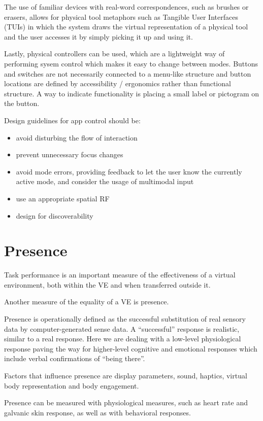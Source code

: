 \documentclass[a4paper]{article}
\begin{document}
The use of familiar devices with real-word correspondences, such as brushes or erasers, allows for physical tool metaphors such as Tangible User Interfaces (TUIs) in which the system draws the virtual representation of a physical tool and the user accesses it by simply picking it up and using it.

Lastly, physical controllers can be used, which are a lightweight way of performing sysem control which makes it easy to change between modes.
Buttons and switches are not necessarily connected to a menu-like structure and button locations are defined by accessibility / ergonomics rather than functional structure.
A way to indicate functionality is placing a small label or pictogram on the button.

Design guidelines for app control should be:
\begin{itemize}
  \item avoid disturbing the flow of interaction
  \item prevent unnecessary focus changes
  \item avoid mode errors, providing feedback to let the user know the currently active mode, and consider the usage of multimodal input
  \item use an appropriate spatial RF
  \item design for discoverability
\end{itemize}


\section{Presence}

Task performance is an important measure of the effectiveness of a
virtual environment, both within the VE and when transferred outside it.

Another measure of the equality of a VE is presence.

Presence is operationally defined as the successful substitution of real
sensory data by computer-generated sense data.
A ``successful'' response
is realistic, similar to a real response.
Here we are dealing with a
low-level physiological response paving the way for higher-level
cognitive and emotional responses which include verbal confirmations of
``being there''.

Factors that influence presence are display parameters, sound, haptics,
virtual body representation and body engagement.

Presence can be measured with physiological measures, such as heart rate
and galvanic skin response, as well as with behavioral responses.
\end{document}
